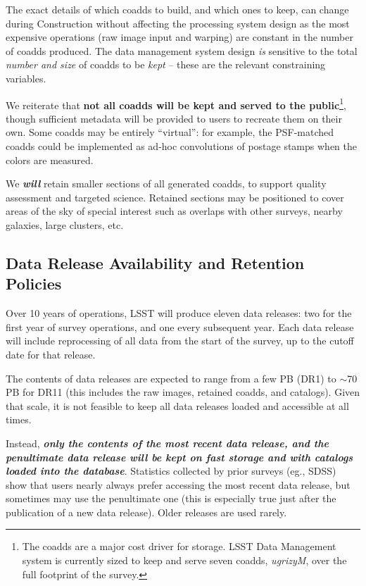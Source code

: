 \documentclass[SE,lsstdraft,toc]{lsstdoc}
\begin{document}
The exact details of which coadds to build, and which ones to keep, can change during Construction without affecting the processing system design as the most expensive operations (raw image input and warping) are constant in the number of coadds produced. The data management system design \emph{is} sensitive to the total \emph{number and size} of coadds to be \emph{kept} -- these are the relevant constraining variables.

We reiterate that \textbf{not all coadds will be kept and served to the public}\footnote{The coadds are a major cost driver for storage. LSST Data Management system is currently sized to keep and serve seven coadds, \emph{ugrizyM}, over the full footprint of the survey.}, though sufficient metadata will be provided to users to recreate them on their own. Some coadds may be entirely ``virtual'': for example, the PSF-matched coadds could be implemented as ad-hoc convolutions of postage stamps when the colors are measured.

We \emph\textbf{will} retain smaller sections of all generated coadds, to support quality assessment and targeted science. Retained sections may be positioned to cover areas of the sky of special interest such as overlaps with other surveys, nearby galaxies, large clusters, etc.

\subsection{Data Release Availability and Retention Policies}
\label{sec:retention}

Over 10 years of operations, LSST will produce eleven data releases: two for the first year of survey operations, and one every subsequent year. Each data release will include reprocessing of all data from the start of the survey, up to the cutoff date for that release.

The contents of data releases are expected to range from a few PB (DR1) to $\sim$70\,PB for DR11 (this includes the raw images, retained coadds, and catalogs). Given that scale, it is not feasible to keep all data releases loaded and accessible at all times.

Instead, \textbf{\emph{only the contents of the most recent data release, and the penultimate data release will be kept on fast storage and with catalogs loaded into the database}}.  Statistics collected by prior surveys (eg., SDSS) show that users nearly always prefer accessing the most recent data release, but sometimes may use the penultimate one (this is especially true just after the publication of a new data release). Older releases are used rarely.
\end{document}
